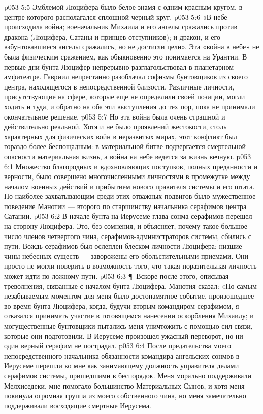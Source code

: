 \vs p053 5:5 Эмблемой Люцифера было белое знамя с одним красным кругом, в центре которого располагался сплошной черный круг.
\vs p053 5:6 «В небе происходила война; военачальник Михаила и его ангелы сражались против дракона (Люцифера, Сатаны и принцев\hyp{}отступников); и дракон, и его взбунтовавшиеся ангелы сражались, но не достигли цели». Эта «война в небе» не была физическим сражением, как обыкновенно это понимается на Урантии. В первые дни бунта Люцифер непрерывно разглагольствовал в планетарном амфитеатре. Гавриил непрестанно разоблачал софизмы бунтовщиков из своего центра, находящегося в непосредственной близости. Различные личности, присутствующие на сфере, которые еще не определили своей позиции, могли ходить и туда, и обратно на оба эти выступления до тех пор, пока не принимали окончательное решение.
\vs p053 5:7 Но эта война была очень страшной и действительно реальной. Хотя и не было проявлений жестокости, столь характерных для физических войн в неразвитых мирах, этот конфликт был гораздо более беспощадным: в материальной битве подвергается смертельной опасности материальная жизнь, а война на небе ведется за жизнь вечную.
\vs p053 6:1 Множество благородных и вдохновляющих поступков, полных преданности и верности, было совершено многочисленными личностями в промежутке между началом военных действий и прибытием нового правителя системы и его штата. Но наиболее захватывающим среди этих отважных подвигов было мужественное поведение Манотии --- второго по старшинству начальника серафимов центра Сатании.
\vs p053 6:2 В начале бунта на Иерусеме глава сонма серафимов перешел на сторону Люцифера. Это, без сомнения, и объясняет, почему такое большое число членов четвертого чина, серафимов\hyp{}администраторов системы, сбились с пути. Вождь серафимов был ослеплен блеском личности Люцифера; низшие чины небесных существ --- заворожены его обольстительными приемами. Они просто не могли поверить в возможность того, что такая поразительная личность может идти по ложному пути.
\vs p053 6:3 \P\ Вскоре после этого, описывая треволнения, связанные с началом бунта Люцифера, Манотия сказал: «Но самым незабываемым моментом для меня было достопамятное событие, произошедшее во время бунта Люцифера, когда, будучи вторым командиром\hyp{}серафимом, я отказался принимать участие в готовящемся нанесении оскорбления Михаилу; и могущественные бунтовщики пытались меня уничтожить с помощью сил связи, которые они подготовили. В Иерусеме произошел ужасный переворот, но ни один верный серафим не пострадал.
\vs p053 6:4 После предательства моего непосредственного начальника обязанности командира ангельских сонмов в Иерусеме перешли ко мне как занимающему должность управителя делами серафимов системы, пришедшими в беспорядок. Меня морально поддерживали Мелхиседеки, мне помогало большинство Материальных Сынов, и хотя меня покинула огромная группа из моего собственного чина, но меня замечательно поддерживали восходящие смертные Иерусема.
